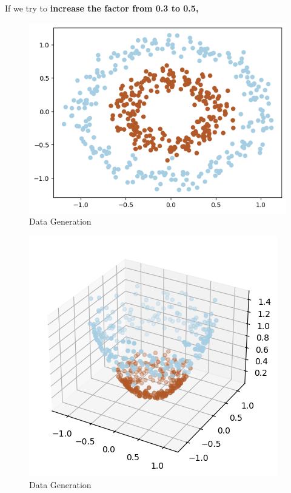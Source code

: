 \documentclass[11pt,a4paper]{article}
\begin{document}
\newpage

If we try to \textbf{increase the factor from 0.3 to 0.5,}

{\begin{figure}[h]
    \centering
    \includegraphics[width=1.0\linewidth]{images/6.png}
    \caption{Data Generation}
\end{figure}}

{\begin{figure}[h]
    \centering
    \includegraphics[width=1.0\linewidth]{images/7.png}
    \caption{Data Generation}
\end{figure}}
\end{document}
